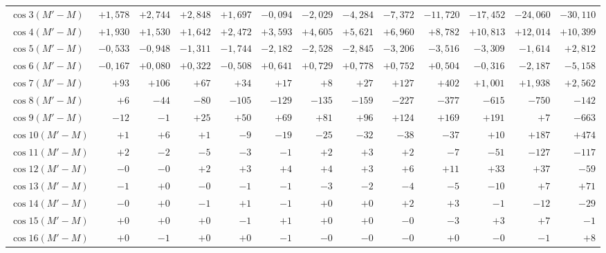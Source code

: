 \begin{landscape}
\begin{longtable}{@{}l|r|r|r|r|r|r|r|r|r|r|r|r@{}}
\(\cos 3(M'-M)\) & \(+1{,}578\) & \(+2{,}744\) & \(+2{,}848\) & \(+1{,}697\) & \(-0{,}094\) & \(-2{,}029\) & \(-4{,}284\) & \(-7{,}372\) & \(-11{,}720\) & \(-17{,}452\) & \(-24{,}060\) & \(-30{,}110\)\\
\(\cos 4(M'-M)\) & \(+1{,}930\) & \(+1{,}530\) & \(+1{,}642\) & \(+2{,}472\) & \(+3{,}593\) & \(+4{,}605\) & \(+5{,}621\) & \(+6{,}960\) & \(+8{,}782\) & \(+10{,}813\) & \(+12{,}014\) & \(+10{,}399\)\\
\(\cos 5(M'-M)\) & \(-0{,}533\) & \(-0{,}948\) & \(-1{,}311\) & \(-1{,}744\) & \(-2{,}182\) & \(-2{,}528\) & \(-2{,}845\) & \(-3{,}206\) & \(-3{,}516\) & \(-3{,}309\) & \(-1{,}614\) & \(+2{,}812\)\\
\(\cos 6(M'-M)\) & \(-0{,}167\) & \(+0{,}080\) & \(+0{,}322\) & \(-0{,}508\) & \(+0{,}641\) & \(+0{,}729\) & \(+0{,}778\) & \(+0{,}752\) & \(+0{,}504\) & \(-0{,}316\) & \(-2{,}187\) & \(-5{,}158\)\\
\(\cos 7(M'-M)\) & \(+93\) & \(+106\) & \(+67\) & \(+34\) & \(+17\) & \(+8\) & \(+27\) & \(+127\) & \(+402\) & \(+1{,}001\) & \(+1{,}938\) & \(+2{,}562\)\\
\(\cos 8(M'-M)\) & \(+6\) & \(-44\) & \(-80\) & \(-105\) & \(-129\) & \(-135\) & \(-159\) & \(-227\) & \(-377\) & \(-615\) & \(-750\) & \(-142\)\\
\(\cos 9(M'-M)\) & \(-12\) & \(-1\) & \(+25\) & \(+50\) & \(+69\) & \(+81\) & \(+96\) & \(+124\) & \(+169\) & \(+191\) & \(+7\) & \(-663\)\\
\(\cos 10(M'-M)\) & \(+1\) & \(+6\) & \(+1\) & \(-9\) & \(-19\) & \(-25\) & \(-32\) & \(-38\) & \(-37\) & \(+10\) & \(+187\) & \(+474\)\\
\(\cos 11(M'-M)\) & \(+2\) & \(-2\) & \(-5\) & \(-3\) & \(-1\) & \(+2\) & \(+3\) & \(+2\) & \(-7\) & \(-51\) & \(-127\) & \(-117\)\\
\(\cos 12(M'-M)\) & \(-0\) & \(-0\) & \(+2\) & \(+3\) & \(+4\) & \(+4\) & \(+3\) & \(+6\) & \(+11\) & \(+33\) & \(+37\) & \(-59\)\\
\(\cos 13(M'-M)\) & \(-1\) & \(+0\) & \(-0\) & \(-1\) & \(-1\) & \(-3\) & \(-2\) & \(-4\) & \(-5\) & \(-10\) & \(+7\) & \(+71\)\\
\(\cos 14(M'-M)\) & \(-0\) & \(+0\) & \(-1\) & \(+1\) & \(-1\) & \(+0\) & \(+0\) & \(+2\) & \(+3\) & \(-1\) & \(-12\) & \(-29\)\\
\(\cos 15(M'-M)\) & \(+0\) & \(+0\) & \(+0\) & \(-1\) & \(+1\) & \(+0\) & \(+0\) & \(-0\) & \(-3\) & \(+3\) & \(+7\) & \(-1\)\\
\(\cos 16(M'-M)\) & \(+0\) & \(-1\) & \(+0\) & \(+0\) & \(-1\) & \(-0\) & \(-0\) & \(-0\) & \(+0\) & \(-0\) & \(-1\) & \(+8\)\\

\end{longtable}
\end{landscape}
